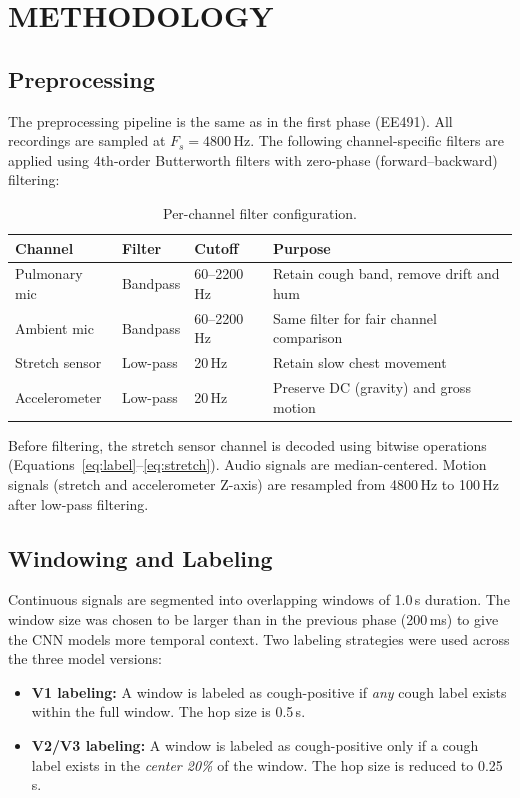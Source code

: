 \chapter{METHODOLOGY}

\section{Preprocessing}

The preprocessing pipeline is the same as in the first phase (EE491). All recordings are sampled at $F_s = 4800$\,Hz. The following channel-specific filters are applied using 4th-order Butterworth filters with zero-phase (forward--backward) filtering:

\begin{table}[H]
\centering
\caption{Per-channel filter configuration.}
\label{tab:filters}
\begin{tabular}{@{}llll@{}}
\toprule
\textbf{Channel} & \textbf{Filter} & \textbf{Cutoff} & \textbf{Purpose} \\
\midrule
Pulmonary mic & Bandpass & 60--2200\,Hz & Retain cough band, remove drift and hum \\
Ambient mic   & Bandpass & 60--2200\,Hz & Same filter for fair channel comparison \\
Stretch sensor & Low-pass & 20\,Hz & Retain slow chest movement \\
Accelerometer  & Low-pass & 20\,Hz & Preserve DC (gravity) and gross motion \\
\bottomrule
\end{tabular}
\end{table}

Before filtering, the stretch sensor channel is decoded using bitwise operations (Equations~\ref{eq:label}--\ref{eq:stretch}). Audio signals are median-centered. Motion signals (stretch and accelerometer Z-axis) are resampled from 4800\,Hz to 100\,Hz after low-pass filtering.

\section{Windowing and Labeling}

Continuous signals are segmented into overlapping windows of 1.0\,s duration. The window size was chosen to be larger than in the previous phase (200\,ms) to give the CNN models more temporal context. Two labeling strategies were used across the three model versions:

\begin{itemize}[nosep]
    \item \textbf{V1 labeling:} A window is labeled as cough-positive if \emph{any} cough label exists within the full window. The hop size is 0.5\,s.
    \item \textbf{V2/V3 labeling:} A window is labeled as cough-positive only if a cough label exists in the \emph{center 20\%} of the window. The hop size is reduced to 0.25\,s.
\end{itemize}

